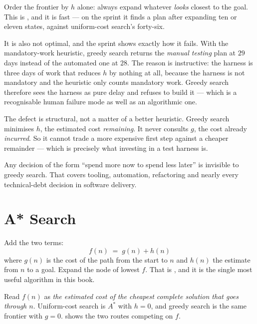 Order the frontier by $h$ alone: always expand whatever \emph{looks} closest to the
goal. This is , and it is fast --- on the sprint it
finds a plan after expanding ten or eleven states, against uniform-cost search's
forty-six.

It is also not optimal, and the sprint shows exactly how it fails. With the
mandatory-work heuristic, greedy search returns the \emph{manual testing} plan at
$29$ days instead of the automated one at $28$. The reason is instructive: the
harness is three days of work that reduces $h$ by nothing at all, because the
harness is not mandatory and the heuristic only counts mandatory work. Greedy search
therefore sees the harness as pure delay and refuses to build it --- which is a
recognisable human failure mode as well as an algorithmic one.

\begin{alertbox}
The defect is structural, not a matter of a better heuristic. Greedy search
minimises $h$, the estimated cost \emph{remaining}. It never consults $g$, the cost
already \emph{incurred}. So it cannot trade a more expensive first step against a
cheaper remainder --- which is precisely what investing in a test harness is.

Any decision of the form ``spend more now to spend less later'' is invisible to
greedy search. That covers tooling, automation, refactoring and nearly every
technical-debt decision in software delivery.
\end{alertbox}

\section{A* Search}

Add the two terms:
\[
  f(n) \;=\; g(n) + h(n)
\]
where $g(n)$ is the cost of the path from the start to $n$ and $h(n)$ the estimate
from $n$ to a goal. Expand the node of lowest $f$. That is , and it is
the single most useful algorithm in this book.

Read $f(n)$ as \emph{the estimated cost of the cheapest complete solution that goes
through $n$}. Uniform-cost search is $A^{*}$ with $h = 0$, and greedy search is the
same frontier with $g = 0$.  shows the two routes competing on $f$.

